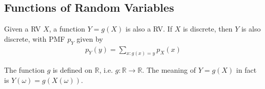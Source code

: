 \documentclass[device=normal, lang=en, fontsize=12pt]{elegantnote}
\numberwithin{equation}{section}
\theoremstyle{definition} %
\begin{document}
\subsection{Functions of Random Variables}
\begin{definition}
    Given a RV $X$, a function $Y = g(X)$ is also a RV. If $X$ is discrete, then $Y$ is also discrete, with PMF $p_{Y}$ given by
    \begin{align}
        p_{Y}(y) = \sum_{x: g(x) = y} p_{X}(x)
    \end{align}
\end{definition}
\begin{remark}
    The function $g$ is defined on $\mathbb{R}$, i.e. $g: \mathbb{R} \rightarrow \mathbb{R}$. The meaning of $Y = g(X)$ in fact is $Y(\omega) = g(X(\omega))$.
\end{remark}
\end{document}
